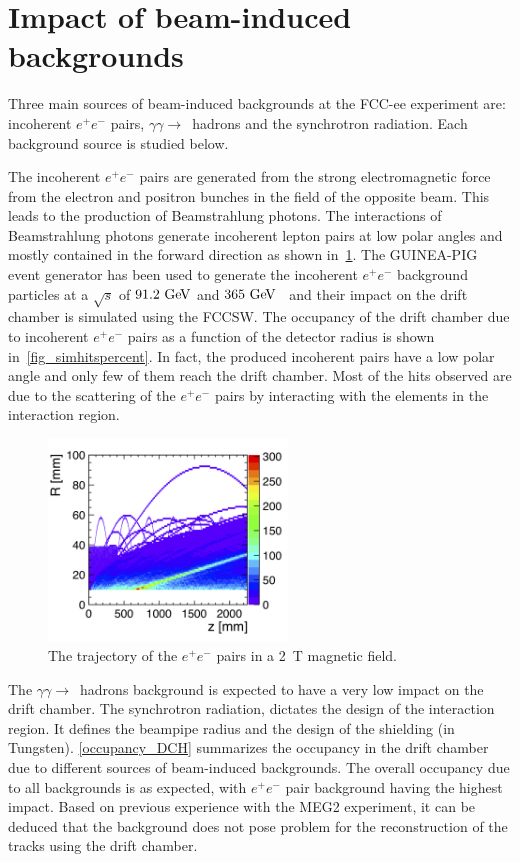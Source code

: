 \documentclass{cernatsnote}
\begin{document}
\section{Impact of beam-induced backgrounds}
Three main sources of beam-induced backgrounds at the FCC-ee experiment are: incoherent $e^+e^-$ pairs, $\gamma\gamma\rightarrow$~hadrons and the synchrotron radiation. Each background source is studied below.

The incoherent $e^+e^-$ pairs are generated from the strong electromagnetic force from the electron and positron bunches in the field of the opposite beam. This leads to the production of Beamstrahlung photons. The interactions of Beamstrahlung photons generate incoherent lepton pairs at low polar angles and mostly contained in the forward direction as shown in~\cref{fig_pairbcg}. The \textsc{GUINEA-PIG}~\cite{Schulte:382453} event generator has been used to generate the incoherent $e^+e^-$ background particles at a $\sqrt{s}$ of $91.2\,\mathrm{\,Ge\kern -0.1em V}$ and $365\,\mathrm{\,Ge\kern -0.1em V}$~\cite{Voutsinas:2017eca} and their impact on the drift chamber is simulated using the FCCSW. The occupancy of the drift chamber due to incoherent $e^+e^-$ pairs as a function of the detector radius is shown in~\cref{fig_simhitspercent}. In fact, the produced incoherent pairs have a low polar angle and only few of them reach the drift chamber. Most of the hits observed are due to the scattering of the $e^+e^-$ pairs by interacting with the elements in the interaction region.


\begin{figure}[!h]
\centering
\includegraphics[width=2.5in]{figures/pairs_R_Z.png}
\caption{The trajectory of the $e^+e^-$ pairs in a 2~T magnetic field.}
\label{fig_pairbcg}
\end{figure}



The $\gamma\gamma\rightarrow$~hadrons background is expected to have a very low impact on the drift chamber. The synchrotron radiation, dictates the design of the interaction region. It defines the beampipe radius and the design of the shielding (in Tungsten).
\cref{occupancy_DCH} summarizes the occupancy in the drift chamber due to different sources of beam-induced backgrounds. The overall occupancy due to all backgrounds is as expected, with $e^+e^-$ pair background having the highest impact. Based on previous experience with the MEG2 experiment, it can be deduced that the background does not pose problem for the reconstruction of the tracks using the drift chamber.
\end{document}
